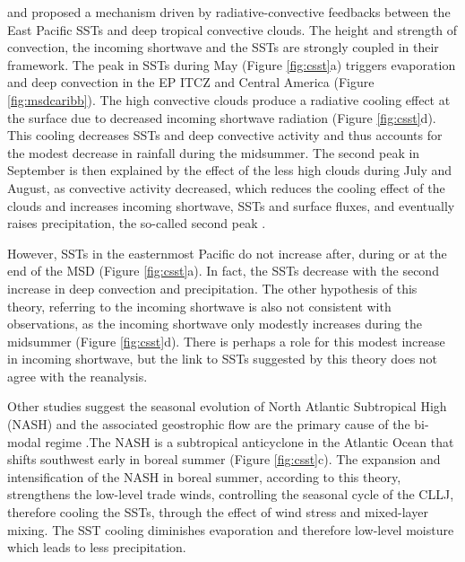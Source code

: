 \cite{magana1999} and \cite{magana2005} proposed a mechanism driven by radiative-convective feedbacks between the East Pacific SSTs and deep tropical convective clouds. The height and strength of convection, the incoming shortwave and the SSTs are strongly coupled in their framework. %
The peak in  SSTs during May (Figure \ref{fig:csst}a) triggers evaporation and deep convection in the EP ITCZ and Central America (Figure \ref{fig:msdcaribb}).
The high convective clouds produce a radiative cooling effect at the surface due to decreased incoming shortwave radiation (Figure \ref{fig:csst}d).
This cooling  decreases SSTs and deep convective activity and thus accounts for the modest decrease in rainfall during the midsummer.
The second peak in September is then explained by the effect of the less high clouds during July and August, as convective activity decreased, which reduces the cooling effect of the clouds and increases incoming shortwave, SSTs and surface fluxes, and eventually raises precipitation, the so-called second peak \citep{magana1999}.

 However, SSTs in the easternmost Pacific do not increase after, during or at the end of the MSD (Figure \ref{fig:csst}a). 
In fact, the SSTs decrease with the second increase in deep convection and precipitation. The other hypothesis of this theory, referring to the incoming shortwave is also not consistent with observations, as the incoming shortwave only modestly increases during the midsummer (Figure \ref{fig:csst}d). There is perhaps a role for this modest increase in incoming shortwave, but the link to SSTs suggested by this theory does not agree with the reanalysis. 

 Other studies suggest the seasonal evolution of North Atlantic Subtropical High (NASH) and the associated geostrophic flow are the primary cause of the bi-modal regime  \citep[e.g.][]{giannini2000,mapes2005,gamble2008,curtis2008}.The NASH is a subtropical anticyclone in the Atlantic Ocean that shifts southwest early in boreal summer (Figure \ref{fig:csst}c). The expansion and intensification of the NASH in boreal summer, according to this theory, strengthens the low-level trade winds, controlling the seasonal cycle of the CLLJ, therefore cooling the SSTs, through the effect of wind stress and mixed-layer mixing.
The SST cooling diminishes evaporation and therefore low-level moisture which leads to less precipitation.


